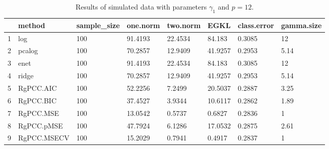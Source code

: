 \begin{table}[ht]
\centering
\begin{tabular}{rlllllll}
  \hline
 & method & sample\_size & one.norm & two.norm & EGKL & class.error & gamma.size \\ 
  \hline
1 & log & 100 & 91.4193 & 22.4534 & 84.183 & 0.3085 & 12 \\ 
  2 & pcalog & 100 & 70.2857 & 12.9409 & 41.9257 & 0.2953 & 5.14 \\ 
  3 & enet & 100 & 91.4193 & 22.4534 & 84.183 & 0.3085 & 12 \\ 
  4 & ridge & 100 & 70.2857 & 12.9409 & 41.9257 & 0.2953 & 5.14 \\ 
  5 & RgPCC.AIC & 100 & 52.2256 & 7.2499 & 20.5037 & 0.2887 & 3.25 \\ 
  6 & RgPCC.BIC & 100 & 37.4527 & 3.9344 & 10.6117 & 0.2862 & 1.89 \\ 
  7 & RgPCC.MSE & 100 & 13.0542 & 0.5737 & 0.6827 & 0.2836 & 1 \\ 
  8 & RgPCC.pMSE & 100 & 47.7924 & 6.1286 & 17.0532 & 0.2875 & 2.61 \\ 
  9 & RgPCC.MSECV & 100 & 15.2029 & 0.7941 & 0.4917 & 0.2837 & 1 \\ 
   \hline
\end{tabular}
\caption{Results of simulated data with parameters $\gamma_1$ and $p =12$. } 
\label{fig-1-100-lead-12-metrics-p}
\end{table}
